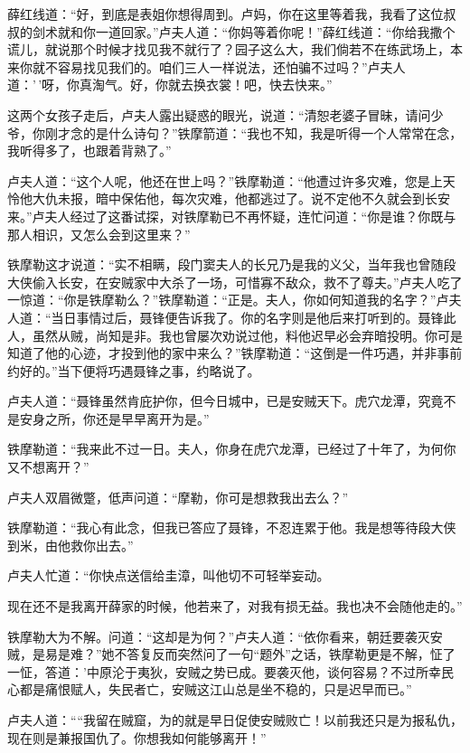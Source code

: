 \documentclass[12pt,oneside]{book}
\begin{document}
薛红线道：``好，到底是表姐你想得周到。卢妈，你在这里等着我，我看了这位叔叔的剑术就和你一道回家。''卢夫人道：``你妈等着你呢！''薛红线道：``你给我撒个谎儿，就说那个时候才找见我不就行了？园子这么大，我们倘若不在练武场上，本来你就不容易找见我们的。咱们三人一样说法，还怕骗不过吗？''卢夫人道：'\,'呀，你真淘气。好，你就去换衣裳！吧，快去快来。''

这两个女孩子走后，卢夫人露出疑惑的眼光，说道：``清恕老婆子冒昧，请问少爷，你刚才念的是什么诗句？''铁摩箭道：``我也不知，我是听得一个人常常在念，我听得多了，也跟着背熟了。''

卢夫人道：``这个人呢，他还在世上吗？''铁摩勒道：``他遭过许多灾难，您是上天怜他大仇未报，暗中保佑他，每次灾难，他都逃过了。说不定他不久就会到长安来。''卢夫人经过了这番试探，对铁摩勒已不再怀疑，连忙问道：``你是谁？你既与那人相识，又怎么会到这里来？''

铁摩勒这才说道：``实不相瞒，段门窦夫人的长兄乃是我的义父，当年我也曾随段大侠偷入长安，在安贼家中大杀了一场，可惜寡不敌众，救不了尊夫。''卢夫人吃了一惊道：``你是铁摩勒么？''铁摩勒道：``正是。夫人，你如何知道我的名字？''卢夫人道：``当日事情过后，聂锋便告诉我了。你的名字则是他后来打听到的。聂锋此人，虽然从贼，尚知是非。我也曾屡次劝说过他，料他迟早必会弃暗投明。你可是知道了他的心迹，才投到他的家中来么？''铁摩勒道：``这倒是一件巧遇，并非事前约好的。''当下便将巧遇聂锋之事，约略说了。

卢夫人道：``聂锋虽然肯庇护你，但今日城中，已是安贼天下。虎穴龙潭，究竟不是安身之所，你还是早早离开为是。''

铁摩勒道：``我来此不过一日。夫人，你身在虎穴龙潭，已经过了十年了，为何你又不想离开？''

卢夫人双眉微蹩，低声问道：``摩勒，你可是想救我出去么？''

铁摩勒道：``我心有此念，但我已答应了聂锋，不忍连累于他。我是想等待段大侠到米，由他救你出去。''

卢夫人忙道：``你快点送信给圭漳，叫他切不可轻举妄动。

现在还不是我离开薛家的时候，他若来了，对我有损无益。我也决不会随他走的。''

铁摩勒大为不解。问道：``这却是为何？''卢夫人道：``依你看来，朝廷要袭灭安贼，是易是难？''她不答复反而突然问了一句``题外''之话，铁摩勒更是不解，怔了一怔，答道：'中原沦于夷狄，安贼之势已成。要袭灭他，谈何容易？不过所幸民心都是痛恨赋人，失民者亡，安贼这江山总是坐不稳的，只是迟早而已。''

卢夫人道：````我留在贼窟，为的就是早日促使安贼败亡！以前我还只是为报私仇，现在则是兼报国仇了。你想我如何能够离开！''
\end{document}
